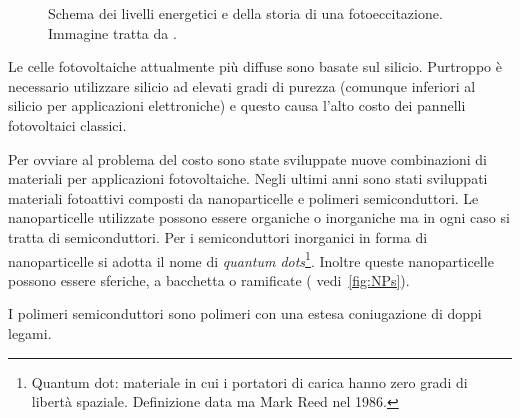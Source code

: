 \begin{figure}
\caption{\footnotesize{Schema dei livelli energetici e della storia di una fotoeccitazione. Immagine tratta da \cite{fv-all}.}
\label{fig:livelli}}
\end{figure}
Le celle fotovoltaiche attualmente più diffuse sono basate sul silicio. 
Purtroppo è necessario utilizzare silicio ad elevati gradi di purezza (comunque inferiori al silicio per applicazioni elettroniche) e questo causa l'alto costo dei pannelli fotovoltaici classici.  
       
Per ovviare al problema del costo sono state sviluppate nuove combinazioni di materiali per applicazioni fotovoltaiche. 
Negli ultimi anni sono stati sviluppati materiali fotoattivi composti da nanoparticelle e polimeri semiconduttori. Le nanoparticelle utilizzate possono essere organiche o inorganiche ma in ogni caso si tratta di semiconduttori. Per i semiconduttori inorganici in forma di nanoparticelle si adotta il nome di \emph{quantum dots}\footnote{Quantum dot: materiale in cui i portatori di carica hanno zero gradi di libertà spaziale. Definizione data ma Mark Reed nel 1986.}. Inoltre queste nanoparticelle possono essere sferiche, a bacchetta o ramificate ( vedi~\ref{fig:NPs}).
          
I polimeri semiconduttori sono polimeri con una estesa coniugazione di doppi legami.        

